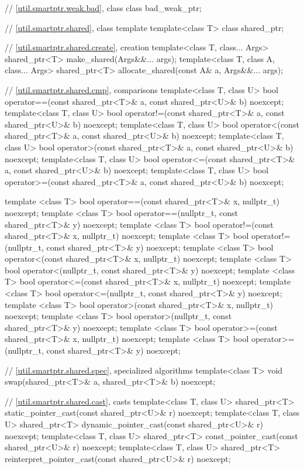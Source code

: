 \begin{codeblock}
{  // \ref{util.smartptr.weak.bad}, class 
  class bad_weak_ptr;

  // \ref{util.smartptr.shared}, class template 
  template<class T> class shared_ptr;

  // \ref{util.smartptr.shared.create},  creation
  template<class T, class... Args>
    shared_ptr<T> make_shared(Args&&... args);
  template<class T, class A, class... Args>
    shared_ptr<T> allocate_shared(const A& a, Args&&... args);

  // \ref{util.smartptr.shared.cmp},  comparisons
  template<class T, class U>
    bool operator==(const shared_ptr<T>& a, const shared_ptr<U>& b) noexcept;
  template<class T, class U>
    bool operator!=(const shared_ptr<T>& a, const shared_ptr<U>& b) noexcept;
  template<class T, class U>
    bool operator<(const shared_ptr<T>& a, const shared_ptr<U>& b) noexcept;
  template<class T, class U>
    bool operator>(const shared_ptr<T>& a, const shared_ptr<U>& b) noexcept;
  template<class T, class U>
    bool operator<=(const shared_ptr<T>& a, const shared_ptr<U>& b) noexcept;
  template<class T, class U>
    bool operator>=(const shared_ptr<T>& a, const shared_ptr<U>& b) noexcept;

  template <class T>
    bool operator==(const shared_ptr<T>& x, nullptr_t) noexcept;
  template <class T>
    bool operator==(nullptr_t, const shared_ptr<T>& y) noexcept;
  template <class T>
    bool operator!=(const shared_ptr<T>& x, nullptr_t) noexcept;
  template <class T>
    bool operator!=(nullptr_t, const shared_ptr<T>& y) noexcept;
  template <class T>
    bool operator<(const shared_ptr<T>& x, nullptr_t) noexcept;
  template <class T>
    bool operator<(nullptr_t, const shared_ptr<T>& y) noexcept;
  template <class T>
    bool operator<=(const shared_ptr<T>& x, nullptr_t) noexcept;
  template <class T>
    bool operator<=(nullptr_t, const shared_ptr<T>& y) noexcept;
  template <class T>
    bool operator>(const shared_ptr<T>& x, nullptr_t) noexcept;
  template <class T>
    bool operator>(nullptr_t, const shared_ptr<T>& y) noexcept;
  template <class T>
    bool operator>=(const shared_ptr<T>& x, nullptr_t) noexcept;
  template <class T>
    bool operator>=(nullptr_t, const shared_ptr<T>& y) noexcept;

  // \ref{util.smartptr.shared.spec},  specialized algorithms
  template<class T>
    void swap(shared_ptr<T>& a, shared_ptr<T>& b) noexcept;

  // \ref{util.smartptr.shared.cast},  casts
  template<class T, class U>
    shared_ptr<T> static_pointer_cast(const shared_ptr<U>& r) noexcept;
  template<class T, class U>
    shared_ptr<T> dynamic_pointer_cast(const shared_ptr<U>& r) noexcept;
  template<class T, class U>
    shared_ptr<T> const_pointer_cast(const shared_ptr<U>& r) noexcept;
  template<class T, class U>
    shared_ptr<T> reinterpret_pointer_cast(const shared_ptr<U>& r) noexcept;

}
\end{codeblock}
